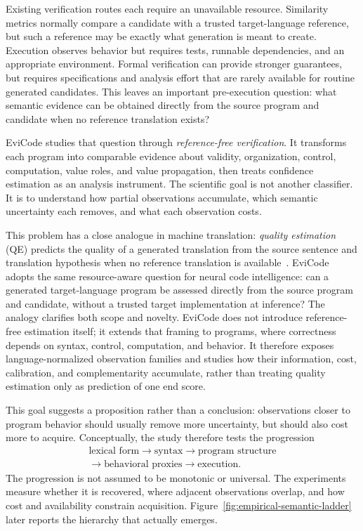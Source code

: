 ﻿\documentclass[conference]{IEEEtran}
\begin{document}
Existing verification routes each require an unavailable resource. Similarity metrics normally compare a candidate with a trusted target-language reference, but such a reference may be exactly what generation is meant to create. Execution observes behavior but requires tests, runnable dependencies, and an appropriate environment. Formal verification can provide stronger guarantees, but requires specifications and analysis effort that are rarely available for routine generated candidates. This leaves an important pre-execution question: what semantic evidence can be obtained directly from the source program and candidate when no reference translation exists?

EviCode studies that question through \emph{reference-free verification}. It transforms each program into comparable evidence about validity, organization, control, computation, value roles, and value propagation, then treats confidence estimation as an analysis instrument. The scientific goal is not another classifier. It is to understand how partial observations accumulate, which semantic uncertainty each removes, and what each observation costs.

This problem has a close analogue in machine translation: \emph{quality estimation} (QE) predicts the quality of a generated translation from the source sentence and translation hypothesis when no reference translation is available~\cite{fonseca2019wmtqe,kepler2019openkiwi,ranasinghe2020transquest,rei2022cometkiwi}. EviCode adopts the same resource-aware question for neural code intelligence: can a generated target-language program be assessed directly from the source program and candidate, without a trusted target implementation at inference? The analogy clarifies both scope and novelty. EviCode does not introduce reference-free estimation itself; it extends that framing to programs, where correctness depends on syntax, control, computation, and behavior. It therefore exposes language-normalized observation families and studies how their information, cost, calibration, and complementarity accumulate, rather than treating quality estimation only as prediction of one end score.

This goal suggests a proposition rather than a conclusion: observations closer to program behavior should usually remove more uncertainty, but should also cost more to acquire. Conceptually, the study therefore tests the progression
\[
\begin{gathered}
\text{lexical form}\rightarrow\text{syntax}\rightarrow\text{program structure}\\[-0.2em]
\rightarrow\text{behavioral proxies}\rightarrow\text{execution}.
\end{gathered}
\]
The progression is not assumed to be monotonic or universal. The experiments measure whether it is recovered, where adjacent observations overlap, and how cost and availability constrain acquisition. Figure~\ref{fig:empirical-semantic-ladder} later reports the hierarchy that actually emerges.
\end{document}
